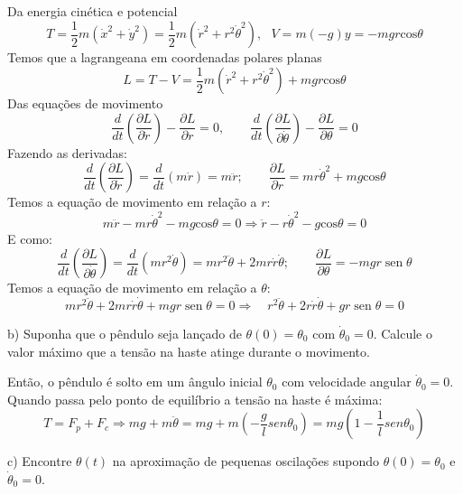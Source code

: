 \begin{enumerate}[start=1,label={\bfseries Q\arabic*.}]
Da energia cinética e potencial
$$
T = \frac{1}{2}m (\dot{x}^{2} + \dot{y}^{2}) = \frac{1}{2}m ( \dot{r}^{2} + r^{2} \dot{\theta}^{2} ), \ \ \
V = m(-g)y = - mgr \mathrm{cos}\theta
$$
%
Temos que a lagrangeana em coordenadas polares planas
%
$$
L = T - V = \frac{1}{2} m ( \dot{r}^{2} + r^{2} \dot{\theta}^{2} ) + mgr \mathrm{cos}\theta
$$
%
Das equações de movimento
%
$$
\frac{d}{dt} \left( \frac{\partial L }{ \partial \dot{r} }  \right) - \frac{ \partial L }{\partial r} = 0, \quad \quad
\frac{d}{dt} \left( \frac{\partial L }{ \partial \dot{\theta} }  \right) - \frac{ \partial L }{\partial \theta} = 0
$$
Fazendo as derivadas:
$$
\frac{d}{dt} \left( \frac{\partial L }{ \partial \dot{r} }  \right) = \frac{d}{d t} (m \dot{r}) = m \ddot{r}; \quad \quad
\frac{\partial L}{\partial r} = mr \dot{\theta}^{2} + mg \mathrm{cos}\theta
$$
Temos a equação de movimento em relação a $r$:
$$
m \ddot{r} - mr \dot{\theta}^{2} - mg\mathrm{cos} \theta = 0 \Rightarrow \boxed{\ddot{r} - r \dot{\theta}^{2} - g \mathrm{cos}\theta  = 0}
$$
E como:
$$
\frac{d}{dt} \left( \frac{\partial L}{\partial \dot{\theta} } \right) = \frac{d}{dt} (mr^{2} \dot{\theta})  = mr^{2} \ddot{\theta} + 2mr \dot{r} \dot{\theta}; \quad \quad \frac{\partial L}{\partial \theta} = - mgr \operatorname{sen}\theta
$$
Temos a equação de movimento em relação a $\theta$:
$$
mr^{2} \ddot{\theta} + 2mr \dot{r} \dot{\theta} + mgr \operatorname{sen} \theta = 0 \Rightarrow \quad  \boxed{ r^{2} \ddot{\theta} + 2r\dot{r} \dot{\theta} + gr \operatorname{sen} \theta = 0}
$$




b) Suponha que o pêndulo seja lançado de $\theta(0) = \theta_{0}$ com $\dot{\theta}_{0} = 0$. Calcule o valor máximo que a tensão na haste atinge durante o movimento.

\resposta Então, o pêndulo é solto em um ângulo inicial $\theta_{0}$ com velocidade angular $\dot{\theta}_{0} = 0$. Quando passa pelo ponto de equilíbrio a tensão na haste é máxima:
$$
T = F_{p} + F_{c} \Rightarrow mg + m\ddot{\theta} = mg + m \left( - \frac{g}{l} sen \theta_{0}  \right) = mg \left( 1 - \frac{1}{l} sen \theta_{0} \right)
$$



c) Encontre $\theta(t)$ na aproximação de pequenas oscilações supondo $\theta(0) = \theta_{0}$ e $\dot{\theta}_{0} = 0$.


\end{enumerate}
